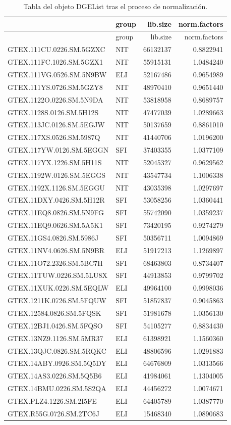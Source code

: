 \documentclass[]{article}
\newenvironment{Shaded}{\begin{snugshade}}{\end{snugshade}}
\newcommand{\DataTypeTok}[1]{\textcolor[rgb]{0.13,0.29,0.53}{#1}}
\newcommand{\KeywordTok}[1]{\textcolor[rgb]{0.13,0.29,0.53}{\textbf{#1}}}
\newcommand{\NormalTok}[1]{#1}
\newcommand{\OperatorTok}[1]{\textcolor[rgb]{0.81,0.36,0.00}{\textbf{#1}}}
\newcommand{\OtherTok}[1]{\textcolor[rgb]{0.56,0.35,0.01}{#1}}
\newcommand{\StringTok}[1]{\textcolor[rgb]{0.31,0.60,0.02}{#1}}
\begin{document}
\begin{Shaded}
\end{Shaded}

\begin{longtable}[]{@{}llrr@{}}
\caption{Tabla del objeto DGEList tras el proceso de
normalización.}\tabularnewline
\toprule
& group & lib.size & norm.factors\tabularnewline
\midrule
\endfirsthead
\toprule
& group & lib.size & norm.factors\tabularnewline
\midrule
\endhead
GTEX.111CU.0226.SM.5GZXC & NIT & 66132137 & 0.8822941\tabularnewline
GTEX.111FC.1026.SM.5GZX1 & NIT & 55915131 & 1.0484240\tabularnewline
GTEX.111VG.0526.SM.5N9BW & ELI & 52167486 & 0.9654989\tabularnewline
GTEX.111YS.0726.SM.5GZY8 & NIT & 48970410 & 0.9651440\tabularnewline
GTEX.1122O.0226.SM.5N9DA & NIT & 53818958 & 0.8689757\tabularnewline
GTEX.1128S.0126.SM.5H12S & NIT & 47477039 & 1.0289663\tabularnewline
GTEX.113JC.0126.SM.5EGJW & NIT & 50137659 & 0.8861010\tabularnewline
GTEX.117XS.0526.SM.5987Q & NIT & 41440706 & 1.0196200\tabularnewline
GTEX.117YW.0126.SM.5EGGN & SFI & 37403355 & 1.0377109\tabularnewline
GTEX.117YX.1226.SM.5H11S & NIT & 52045327 & 0.9629562\tabularnewline
GTEX.1192W.0126.SM.5EGGS & NIT & 43547734 & 1.1006338\tabularnewline
GTEX.1192X.1126.SM.5EGGU & NIT & 43035398 & 1.0297697\tabularnewline
GTEX.11DXY.0426.SM.5H12R & SFI & 53058256 & 1.0360441\tabularnewline
GTEX.11EQ8.0826.SM.5N9FG & SFI & 55742090 & 1.0359237\tabularnewline
GTEX.11EQ9.0626.SM.5A5K1 & SFI & 73420195 & 0.9274279\tabularnewline
GTEX.11GS4.0826.SM.5986J & SFI & 50356711 & 1.0094869\tabularnewline
GTEX.11NV4.0626.SM.5N9BR & ELI & 51917213 & 1.1269897\tabularnewline
GTEX.11O72.2326.SM.5BC7H & SFI & 68463803 & 0.8734407\tabularnewline
GTEX.11TUW.0226.SM.5LU8X & SFI & 44913853 & 0.9799702\tabularnewline
GTEX.11XUK.0226.SM.5EQLW & ELI & 49964100 & 0.9998036\tabularnewline
GTEX.1211K.0726.SM.5FQUW & SFI & 51857837 & 0.9045863\tabularnewline
GTEX.12584.0826.SM.5FQSK & SFI & 51981678 & 1.0356130\tabularnewline
GTEX.12BJ1.0426.SM.5FQSO & SFI & 54105277 & 0.8834430\tabularnewline
GTEX.13NZ9.1126.SM.5MR37 & ELI & 61398921 & 1.1560360\tabularnewline
GTEX.13QJC.0826.SM.5RQKC & ELI & 48806596 & 1.0291883\tabularnewline
GTEX.14ABY.0926.SM.5Q5DY & ELI & 64676809 & 1.0313566\tabularnewline
GTEX.14AS3.0226.SM.5Q5B6 & ELI & 41984061 & 1.1304005\tabularnewline
GTEX.14BMU.0226.SM.5S2QA & ELI & 44456272 & 1.0074671\tabularnewline
GTEX.PLZ4.1226.SM.2I5FE & ELI & 64405789 & 1.0387770\tabularnewline
GTEX.R55G.0726.SM.2TC6J & ELI & 15468340 & 1.0890683\tabularnewline
\bottomrule
\end{longtable}
\end{document}
